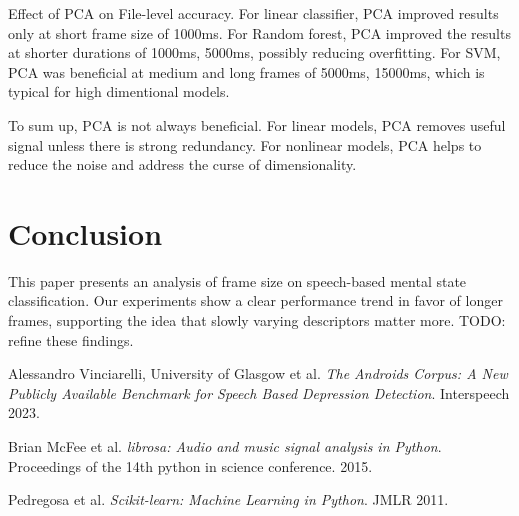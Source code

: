 \documentclass[conference]{IEEEtran}
\begin{document}
Effect of PCA on File-level accuracy.
For linear classifier, PCA improved results only at short frame size of 1000ms.
For Random forest, PCA improved the results at shorter durations of 1000ms, 5000ms, possibly reducing overfitting.
For SVM, PCA was beneficial at medium and long frames of 5000ms, 15000ms, which is typical for high dimentional models.

To sum up, PCA is not always beneficial. 
For linear models, PCA removes useful signal unless there is strong redundancy.
For nonlinear models, PCA helps to reduce the noise and address the curse of dimensionality.

\section{Conclusion}
This paper presents an analysis of frame size on speech-based mental state classification. 
Our experiments show a clear performance trend in favor of longer frames, supporting the idea that slowly varying descriptors matter more. 
TODO: refine these findings.

\begin{thebibliography}{9}
Alessandro Vinciarelli, University of Glasgow et al. \textit{The Androids Corpus: A New Publicly Available Benchmark for Speech Based Depression Detection}. Interspeech 2023.

Brian McFee et al. \textit{librosa: Audio and music signal analysis in Python}. Proceedings of the 14th python in science conference. 2015.

Pedregosa et al. \textit{Scikit-learn: Machine Learning in Python}. JMLR 2011.

\end{thebibliography}
\end{document}
